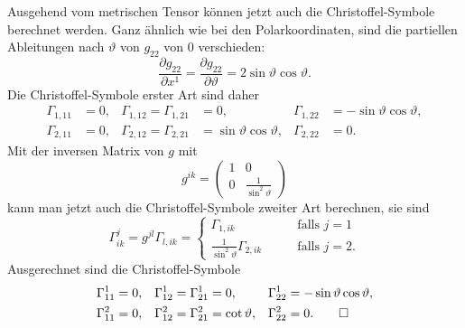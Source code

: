 \begin{beispiel}
Ausgehend vom metrischen Tensor können jetzt auch die Christoffel-Symbole
berechnet werden.
Ganz ähnlich wie bei den Polarkoordinaten, sind
die partiellen Ableitungen nach $\vartheta$ von $g_{22}$ von $0$
verschieden:
\[
\frac{\partial g_{22}}{\partial x^1}
=
\frac{\partial g_{22}}{\partial\vartheta}
=
2\sin\vartheta\cos\vartheta.
\]
Die Christoffel-Symbole erster Art sind daher
\[
\begin{aligned}
\Gamma_{1,11}
&=
0,
&
\Gamma_{1,12} = \Gamma_{1,21}
&=
0,
&
\Gamma_{1,22}
&=
-\sin\vartheta\cos\vartheta,
\\
\Gamma_{2,11}
&=
0,
&
\Gamma_{2,12} = \Gamma_{2,21}
&=
\sin\vartheta\cos\vartheta,
&
\Gamma_{2,22}
&=
0.
\end{aligned}
\]
Mit der inversen Matrix von $g$ mit
\[
g^{ik}
=
\begin{pmatrix}
1&0\\
0&\frac{1}{\sin^2\vartheta}
\end{pmatrix}
\]
kann man jetzt auch die Christoffel-Symbole zweiter Art berechnen,
sie sind
\[
\Gamma^j_{ik}
=
g^{jl}\Gamma_{l,ik}
=
\begin{cases}
\Gamma_{1,ik}&\qquad\text{falls $j=1$}\\
\frac{1}{\sin^2\vartheta}\Gamma_{2,ik}&\qquad\text{falls $j=2$}.
\end{cases}
\]
Ausgerechnet sind die Christoffel-Symbole
\[
\begin{aligned}
\Gamma^1_{11}
&=
0,
&
\Gamma^1_{12}
=
\Gamma^1_{21}
&=
0,
&
\Gamma^1_{22}
&=
-\sin\vartheta\cos\vartheta,
\\
\Gamma^2_{11}
&=
0,
&
\Gamma^2_{12}
=
\Gamma^2_{21}
&=
\cot\vartheta,
&
\Gamma^2_{22}
&=
0.
\qedhere
\end{aligned}
\]
\end{beispiel}

